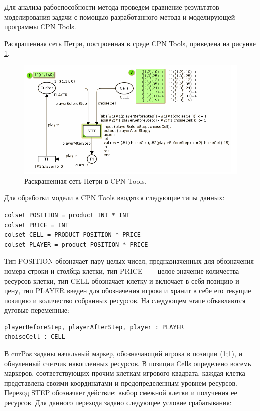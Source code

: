 Для анализа рабоспособности метода проведем сравнение результатов моделирования задачи с помощью разработанного метода и моделирующей программы CPN Tools.

Раскрашенная сеть Петри, построенная в среде CPN Tools, приведена на рисунке \ref{fig:fig28}.

\begin{figure}
	\begin{center}
		\includegraphics[scale=1]{include/CPNTools.png}
	\end{center}
	\caption{Раскрашенная сеть Петри в CPN Tools.}
	\label{fig:fig28}
\end{figure}

Для обработки модели в CPN Tools вводятся следующие типы данных:

\begin{verbatim}
colset POSITION = product INT * INT
colset PRICE = INT
colset CELL = PRODUCT POSITION * PRICE
colset PLAYER = product POSITION * PRICE
\end{verbatim}

Тип POSITION обозначает пару целых чисел, предназначенных для обозначения номера строки и столбца клетки, тип PRICE ~--- целое значение количества ресурсов клетки, тип CELL обозначает клетку и включает в себя позицию и цену, тип PLAYER введен для обозначения игрока и хранит в себе его текущие позицию и количество собранных ресурсов. На следующем этапе объявляются дуговые переменные:
\begin{verbatim}
playerBeforeStep, playerAfterStep, player : PLAYER
choiseCell : CELL
\end{verbatim}

В curPos заданы начальный маркер, обозначающий игрока в позиции (1;1), и обнуленный счетчик накопленных ресурсов. В позиции Cells определено восемь маркеров, соответствующих прочим клеткам игрового квадрата, каждая клетка представлена своими координатами и предопределенным уровнем ресурсов. Переход STEP обозначает действие: выбор смежной клетки и получения ее ресурсов. Для данного перехода задано следующее условие срабатывания:

